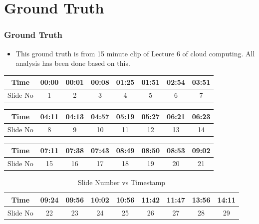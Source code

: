 \documentclass{beamer}
\begin{document}
\section{Ground Truth}
\begin{frame}
\frametitle{Ground Truth}
	\begin{itemize}
		\item This ground truth is from 15 minute clip of Lecture 6 of cloud computing. All analysis has been done based on this.
	\end{itemize}
\begin{table}[]
	\begin{tabular}{|c|c|c|c|c|c|c|c|}
		\hline
		Time & 00:00 & 00:01 & 00:08 & 01:25 & 01:51 & 02:54 & 03:51 \\ \hline
		Slide No   & 1     & 2     & 3     & 4     & 5     & 6     & 7     \\ \hline
	\end{tabular}
\end{table}

\begin{table}[]
	\begin{tabular}{|c|c|c|c|c|c|c|c|}
		\hline
		Time & 04:11 & 04:13 & 04:57 & 05:19 & 05:27 & 06:21 & 06:23 \\ \hline
		Slide No   & 8     & 9     & 10    & 11    & 12    & 13    & 14    \\ \hline
	\end{tabular}
\end{table}

\begin{table}[]
	\begin{tabular}{|c|c|c|c|c|c|c|c|}
		\hline
		Time & 07:11 & 07:38 & 07:43 & 08:49 & 08:50 & 08:53 & 09:02 \\ \hline
		Slide No   & 15    & 16    & 17    & 18    & 19    & 20    & 21    \\ \hline
	\end{tabular}
\end{table}

\begin{table}[]
	\begin{tabular}{|c|c|c|c|c|c|c|c|c|}
		\hline
		Time & 09:24 & 09:56 & 10:02 & 10:56 & 11:42 & 11:47 & 13:56 & 14:11 \\ \hline
		Slide No   & 22    & 23    & 24    & 25    & 26    & 27    & 28    & 29    \\ \hline
	\end{tabular}
	\caption{Slide Number vs Timestamp}
\end{table}

\end{frame}
\end{document}
